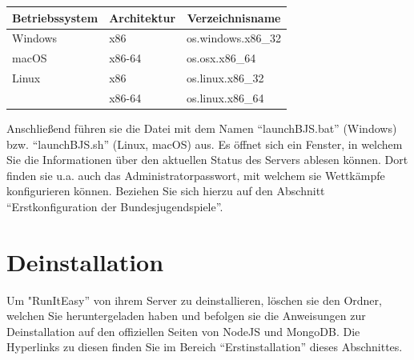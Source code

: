 \documentclass[11pt,a4paper,titlepage,german]{article}
\begin{document}
			\begin{center}
				\def\arraystretch{2}
				\begin{tabular}{ l | l | l }
					\multicolumn{1}{c}{\bfseries Betriebssystem} & \multicolumn{1}{c}{\bfseries Architektur} & \multicolumn{1}{c}{\bfseries Verzeichnisname} \\
					\hline
					Windows & x86 & os.windows.x86\_32 \\
					\hline
					macOS & x86-64 & os.osx.x86\_64 \\
					\hline
					Linux & x86 & os.linux.x86\_32 \\
					 & x86-64 & os.linux.x86\_64
				\end{tabular}
			\end{center}
			
			Anschließend führen sie die Datei mit dem Namen “launchBJS.bat” (Windows) bzw. “launchBJS.sh” (Linux, macOS) aus. Es öffnet sich ein Fenster, in welchem Sie die Informationen über den aktuellen Status des Servers ablesen können. Dort finden sie u.a. auch das Administratorpasswort, mit welchem sie Wettkämpfe konfigurieren können. Beziehen Sie sich hierzu auf den Abschnitt “Erstkonfiguration der Bundesjugendspiele”.
			
		\section{Deinstallation}
			Um "RunItEasy” von ihrem Server zu deinstallieren, löschen sie den Ordner, welchen Sie heruntergeladen haben und befolgen sie die Anweisungen zur Deinstallation auf den offiziellen Seiten von NodeJS und MongoDB. Die Hyperlinks zu diesen finden Sie im Bereich “Erstinstallation” dieses Abschnittes.
		
	\newpage
		
\end{document}
